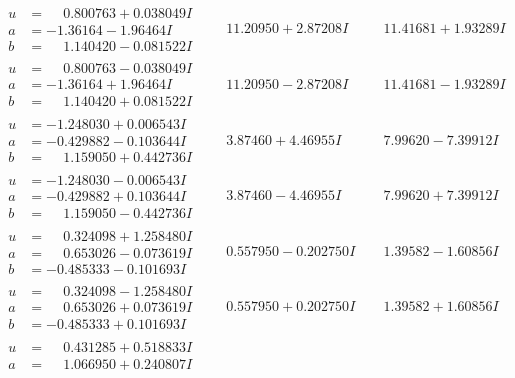 \documentclass[1p]{elsarticle_modified}
\theoremstyle{definition}
\begin{document}
$$\begin{array}{c|c|c}
\begin{aligned}
u &= \phantom{-}0.800763 + 0.038049 I \\
a &= -1.36164 - 1.96464 I \\
b &= \phantom{-}1.140420 - 0.081522 I\end{aligned}
 & \phantom{-}11.20950 + 2.87208 I & \phantom{-}11.41681 + 1.93289 I \\ \hline\begin{aligned}
u &= \phantom{-}0.800763 - 0.038049 I \\
a &= -1.36164 + 1.96464 I \\
b &= \phantom{-}1.140420 + 0.081522 I\end{aligned}
 & \phantom{-}11.20950 - 2.87208 I & \phantom{-}11.41681 - 1.93289 I \\ \hline\begin{aligned}
u &= -1.248030 + 0.006543 I \\
a &= -0.429882 - 0.103644 I \\
b &= \phantom{-}1.159050 + 0.442736 I\end{aligned}
 & \phantom{-}3.87460 + 4.46955 I & \phantom{-}7.99620 - 7.39912 I \\ \hline\begin{aligned}
u &= -1.248030 - 0.006543 I \\
a &= -0.429882 + 0.103644 I \\
b &= \phantom{-}1.159050 - 0.442736 I\end{aligned}
 & \phantom{-}3.87460 - 4.46955 I & \phantom{-}7.99620 + 7.39912 I \\ \hline\begin{aligned}
u &= \phantom{-}0.324098 + 1.258480 I \\
a &= \phantom{-}0.653026 - 0.073619 I \\
b &= -0.485333 - 0.101693 I\end{aligned}
 & \phantom{-}0.557950 - 0.202750 I & \phantom{-}1.39582 - 1.60856 I \\ \hline\begin{aligned}
u &= \phantom{-}0.324098 - 1.258480 I \\
a &= \phantom{-}0.653026 + 0.073619 I \\
b &= -0.485333 + 0.101693 I\end{aligned}
 & \phantom{-}0.557950 + 0.202750 I & \phantom{-}1.39582 + 1.60856 I \\ \hline\begin{aligned}
u &= \phantom{-}0.431285 + 0.518833 I \\
a &= \phantom{-}1.066950 + 0.240807 I \\

\end{aligned}
\end{array}$$
\end{document}

